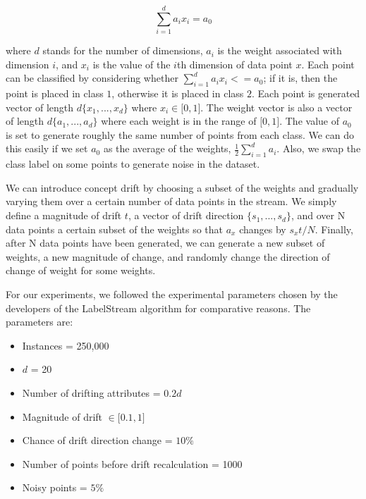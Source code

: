 \documentclass[12pt,a4paper,oneside]{report}
\begin{document}
\[  \sum_{i = 1}^d a_i x_i = a_0 \]

where \(d\) stands for the number of dimensions, \( a_i \) is the weight associated with dimension \(i\),  and \(x_i\) is the value of the \(i\)th dimension of data point \(x\). Each point can be classified by considering whether  \(  \sum_{i = 1}^d a_i x_i <= a_0 \); if it is, then the point is placed in class \(1\), otherwise it is placed in class \(2\). Each point is generated vector of length \( d  \lbrace x_1,...,x_d  \rbrace \) where \( x_i  \in \lbrack  0,1 \rbrack \).  The weight vector is also a vector of length \( d  \lbrace a_1,...,a_d  \rbrace \) where each weight is in the range of \( \lbrack 0,1 \rbrack \).  The value of \( a_0 \) is set to generate roughly the same number of points from each class. We can do this easily if we set \(a_0\) as the average of the weights, \( \frac{1}{2} \sum_{i=1}^d a_i\). Also, we swap the class label on some points to generate noise in the dataset. 

We can introduce concept drift by choosing a subset of the weights and gradually varying them over a certain number of data points in the stream. We simply define a magnitude of drift \(t\), a vector of drift direction  \( \lbrace s_1,...,s_d  \rbrace \), and over N data points a certain subset of the weights so that \( a_x \) changes by \(  s_xt / N \). Finally, after N data points have been generated, we can generate a new subset of weights, a new magnitude of change, and randomly change the direction of change of weight for some weights.

For our experiments, we followed the experimental parameters chosen by the developers of the LabelStream algorithm for comparative reasons. The parameters are:
\begin{itemize}
\item Instances = 250,000\\
\item \(d\) = 20 \\
\item Number of drifting attributes = \(0.2d\)\\
\item Magnitude of drift \(\in \lbrack 0.1,1\rbrack \) \\
\item Chance of drift direction change = \(10 \% \) \\
\item Number of points before drift recalculation  = 1000\\
\item Noisy points = \(5\% \)
\end{itemize}
\end{document}
